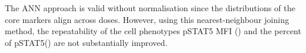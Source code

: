 The \gls{ANN} approach is valid without normalisation since the distributions of the core markers align across doses.
However, using this nearest-neighbour joining method, the repeatability of the cell phenotypes pSTAT5 MFI ()
and the percent of pSTAT5\positive () are not substantially improved.


